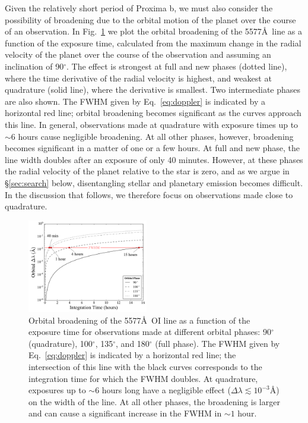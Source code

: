 \documentclass{emulateapj}
\begin{document}
Given the relatively short period of Proxima b, we must also consider the possibility of broadening due to the orbital motion of the planet over the course of an observation. In Fig.~\ref{fig:orbital_broadening} we plot the orbital broadening of the 5577\AA\ line as a function of the exposure time, calculated from the maximum change in the radial velocity of the planet over the course of the observation and assuming an inclination of 90$^\circ$. The effect is strongest at full and new phases (dotted line), where the time derivative of the radial velocity is highest, and weakest at quadrature (solid line), where the derivative is smallest. Two intermediate phases are also shown. The FWHM given by Eq.~\ref{eq:doppler} is indicated by a horizontal red line; orbital broadening becomes significant as the curves approach this line. In general, observations made at quadrature with exposure times up to ${\sim} 6$ hours cause negligible broadening. At all other phases, however, broadening becomes significant in a matter of one or a few hours. At full and new phase, the line width doubles after an exposure of only 40 minutes. However, at these phases the radial velocity of the planet relative to the star is zero, and as we argue in \S\ref{sec:search} below, disentangling stellar and planetary emission becomes difficult. In the discussion that follows, we therefore focus on observations made close to quadrature.

\begin{figure}[bt]
\includegraphics[width=0.47\textwidth]{orbital_broadening.pdf}
\caption{Orbital broadening of the 5577\AA\ OI line as a function of the exposure time for observations made at different orbital phases: 90$^\circ$ (quadrature), 100$^\circ$, 135$^\circ$, and 180$^\circ$ (full phase). The FWHM given by Eq.~\ref{eq:doppler} is indicated by a horizontal red line; the intersection of this line with the black curves corresponds to the integration time for which the FWHM doubles. At quadrature, exposures up to ${\sim} 6$ hours long have a negligible effect ($\Delta\lambda \lesssim 10^{-3}$\AA) on the width of the line. At all other phases, the broadening is larger and can cause a significant increase in the FWHM in ${\sim} 1$ hour.\\[0in]}
\label{fig:orbital_broadening}
\end{figure}
\end{document}
